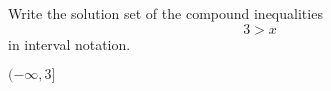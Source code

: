 

Write the solution set of the compound inequalities
\[3>x \]
in interval notation.

\begin{solution}
$(-\infty, 3]$
\end{solution}